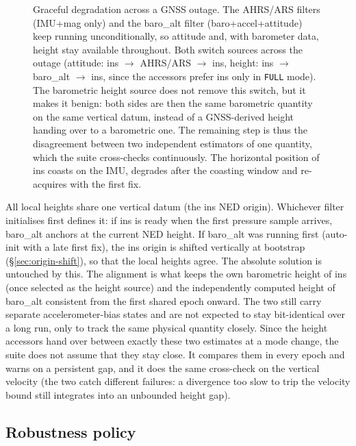 \documentclass[11pt,a4paper]{article}
\newcommand{\code}[1]{\texttt{#1}}
\begin{document}
\begin{figure}[htbp]
{%
}
\caption{Graceful degradation across a GNSS outage. The AHRS/ARS filters
(IMU+mag only) and the baro\_alt filter (baro+accel+attitude) keep running
unconditionally, so attitude and, with barometer data, height stay available
throughout. Both switch sources across the outage (attitude: ins $\rightarrow$
AHRS/ARS $\rightarrow$ ins, height: ins $\rightarrow$ baro\_alt $\rightarrow$
ins, since the accessors prefer ins only in \code{FULL} mode). The barometric
height source does not remove this switch, but it makes it benign: both sides
are then the same barometric quantity on the same vertical datum, instead of a
GNSS-derived height handing over to a barometric one. The remaining step is
thus the disagreement between two independent estimators of one quantity, which
the suite cross-checks continuously. The horizontal position of ins coasts on
the IMU, degrades after the coasting window and re-acquires with the first
fix.}
\label{fig:degradation}
\end{figure}

All local heights share one vertical datum (the ins NED origin). Whichever
filter initialises first defines it: if ins is ready when the first pressure
sample arrives, baro\_alt anchors at the current NED height. If baro\_alt was
running first (auto-init with a late first fix), the ins origin is shifted
vertically at bootstrap (\S\ref{sec:origin-shift}), so that the local heights
agree. The absolute solution is untouched by this. The alignment is what keeps
the own barometric height of ins (once selected as the height source) and the
independently computed height of baro\_alt consistent from the first shared
epoch onward. The two still carry separate accelerometer-bias states and are not
expected to stay bit-identical over a long run, only to track the same physical
quantity closely. Since the height accessors hand over between exactly these two
estimates at a mode change, the suite does not assume that they stay close. It
compares them in every epoch and warns on a persistent gap, and it does the same
cross-check on the vertical velocity (the two catch different failures: a
divergence too slow to trip the velocity bound still integrates into an
unbounded height gap).

\subsection{Robustness policy}
\label{sec:robust}
\end{document}
